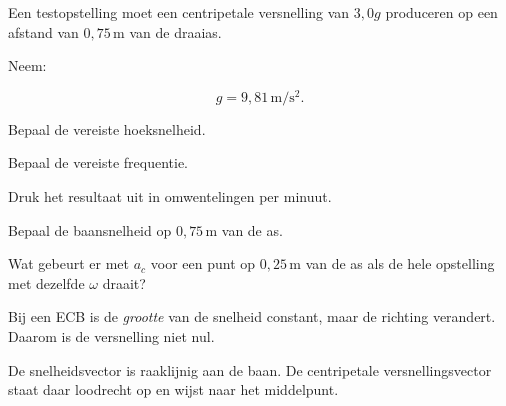 \documentclass{ximera}
\begin{document}
\begin{oefening}{\oefG}

Een testopstelling moet een centripetale versnelling van
$3,0g$ produceren op een afstand van $0,75\,\mathrm{m}$ van de draaias.

Neem:

\[
g=9,81\,\mathrm{m/s^2}.
\]

\begin{question}
Bepaal de vereiste hoeksnelheid.
\end{question}

\begin{question}
Bepaal de vereiste frequentie.
\end{question}

\begin{question}
Druk het resultaat uit in omwentelingen per minuut.
\end{question}

\begin{question}
Bepaal de baansnelheid op $0,75\,\mathrm{m}$ van de as.
\end{question}

\begin{question}
Wat gebeurt er met $a_c$ voor een punt op $0,25\,\mathrm{m}$ van de
as als de hele opstelling met dezelfde $\omega$ draait?
\end{question}

\end{oefening}










\begin{opmerking}[Misconceptie 1: ``eenparig'' betekent $a=0$]

Bij een ECB is de \emph{grootte} van de snelheid constant, maar de
richting verandert. Daarom is de versnelling niet nul.

\end{opmerking}

\begin{opmerking}

De snelheidsvector is raaklijnig aan de baan. De centripetale
versnellingsvector staat daar loodrecht op en wijst naar het middelpunt.

\end{opmerking}
\end{document}
